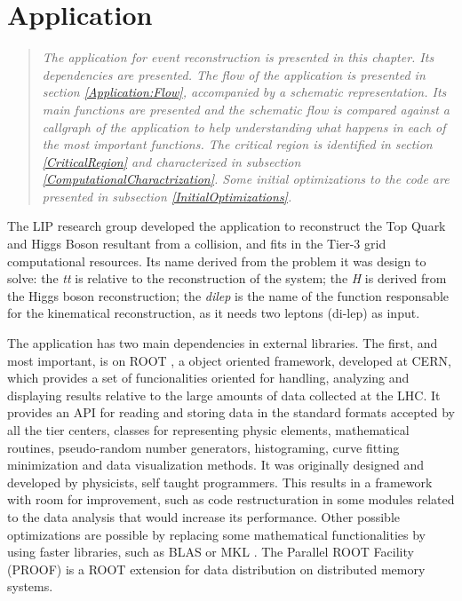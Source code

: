 \chapter{\tth Application}
\label{Application}

\begin{quote}
\textit{The \tth application for event reconstruction is presented in this chapter. Its dependencies are presented. The flow of the application is presented in section \ref{Application:Flow}, accompanied by a schematic representation. Its main functions are presented and the schematic flow is compared against a callgraph of the application to help understanding what happens in each of the most important functions. The critical region is identified in section \ref{CriticalRegion} and characterized in subsection \ref{ComputationalCharactrization}. Some initial optimizations to the code are presented in subsection \ref{InitialOptimizations}.}
\end{quote}

The LIP research group developed the \tth application to reconstruct the Top Quark and Higgs Boson resultant from a collision, and fits in the Tier-3 grid computational resources. Its name derived from the problem it was design to solve: the \textit{tt} is relative to the reconstruction of the \ttbar system; the \textit{H} is derived from the Higgs boson reconstruction; the \textit{dilep} is the name of the function responsable for the kinematical reconstruction, as it needs two leptons (di-lep) as input.

The application has two main dependencies in external libraries. The first, and most important, is on ROOT \cite{CERN:ROOT}, a object oriented framework, developed at CERN, which provides a set of funcionalities oriented for handling, analyzing and displaying results relative to the large amounts of data collected at the LHC. It provides an API for reading and storing data in the standard formats accepted by all the tier centers, classes for representing physic elements, mathematical routines, pseudo-random number generators, histograming, curve fitting minimization and data visualization methods. It was originally designed and developed by physicists, self taught programmers. This results in a framework with room for improvement, such as code restructuration in some modules related to the data analysis that would increase its performance. Other possible optimizations are possible by replacing some mathematical functionalities by using faster libraries, such as BLAS \cite{BLAS} or MKL \cite{MKL}. The Parallel ROOT Facility (PROOF) \cite{CERN:PROOF} is a ROOT extension for data distribution on distributed memory systems.

